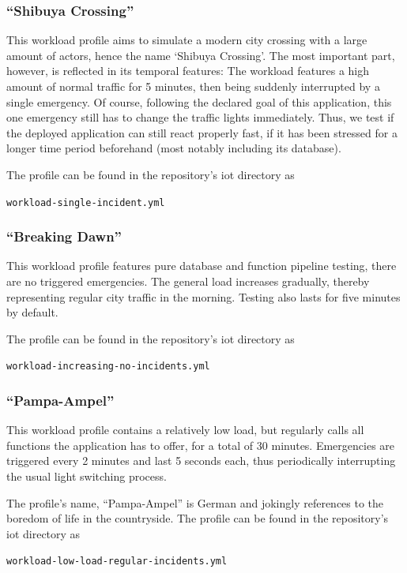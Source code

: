 \documentclass[../main.tex]{subfiles}
\begin{document}
\subsubsection{``Shibuya Crossing''}%
\label{ssub:iotShibuya}

This workload profile aims to simulate a modern city crossing with a large amount of actors,
hence the name `Shibuya Crossing'.
The most important part, however, is reflected in its temporal features:
The workload features a high amount of normal traffic for 5 minutes,
then being suddenly interrupted by a single emergency.
Of course, following the declared goal of this application, this one emergency still has to change the traffic lights immediately.
Thus, we test if the deployed application can still react properly fast, 
if it has been stressed for a longer time period beforehand (most notably including its database).

The profile can be found in the repository's iot directory as 
\begin{tcolorbox}
\quad\texttt{workload-single-incident.yml}
\end{tcolorbox}

\subsubsection{``Breaking Dawn''}%
\label{ssub:iotDawn}

This workload profile features pure database and function pipeline testing, there are no triggered emergencies.
The general load increases gradually, thereby representing regular city traffic in the morning.
Testing also lasts for five minutes by default.

The profile can be found in the repository's iot directory as 
\begin{tcolorbox}
\quad\texttt{workload-increasing-no-incidents.yml}
\end{tcolorbox}

\subsubsection{``Pampa-Ampel''}%
\label{ssub:iotPampaAmpel}

This workload profile contains a relatively low load, but regularly calls all functions the application has to offer,
for a total of 30 minutes.
Emergencies are triggered every 2 minutes and last 5 seconds each, 
thus periodically interrupting the usual light switching process.

The profile's name, ``Pampa-Ampel'' is German and jokingly references to the boredom of life in the countryside.
The profile can be found in the repository's iot directory as 
\begin{tcolorbox}
\quad\texttt{workload-low-load-regular-incidents.yml}
\end{tcolorbox}
\end{document}
